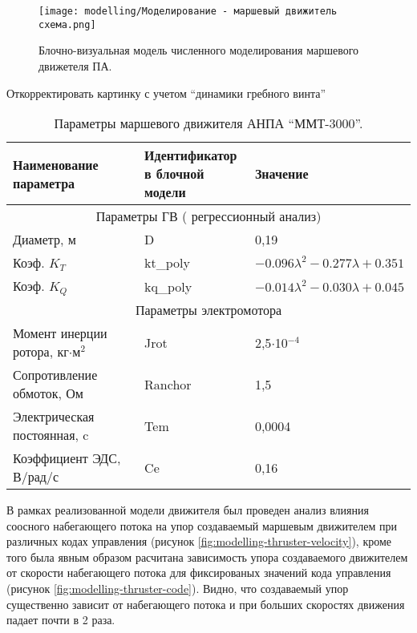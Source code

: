 \begin{figure}[ht]
    \centering
    \texttt{[image: modelling/Моделирование - маршевый движитель схема.png]}
    \caption{Блочно-визуальная модель численного моделирования маршевого движетеля ПА.}
    \label{fig:modelling-thruster}
\end{figure}

\begin{noteplan}
    Откорректировать картинку с учетом ``динамики гребного винта''
\end{noteplan}

\begin{table}
    \caption{Параметры маршевого движителя АНПА ``ММТ-3000''.}
    \label{tab:modelling-thruster}
    \centering
    \begin{tabular}{lll}
        \toprule
        \makecell[l]{Наименование \\ параметра} & \makecell[l]{Идентификатор \\ в блочной модели} & Значение \\
        \midrule
        \multicolumn{3}{c}{Параметры ГВ ( регрессионный анализ)} \\
        \midrule
        Диаметр, м  & D & 0,19\\
        Коэф. $K_T$ & kt\_poly & $-0.096\lambda^2 -0.277\lambda + 0.351$\\
        Коэф. $K_Q$ & kq\_poly & $-0.014\lambda^2 -0.030\lambda + 0.045$\\
        \midrule
        \multicolumn{3}{c}{Параметры электромотора} \\
        \midrule
        Момент инерции ротора, кг$\cdot$м$^2$ & Jrot & 2,5$\cdot$10$^{-4}$ \\
        Сопротивление обмоток, Ом & Ranchor & 1,5 \\
        Электрическая постоянная, c & Tem & 0,0004 \\
        Коэффициент ЭДС, В/рад/с & Ce & 0,16 \\
        \bottomrule
    \end{tabular}
\end{table}

В рамках реализованной модели движителя был проведен анализ влияния соосного набегающего потока на упор создаваемый маршевым движителем при различных кодах управления (рисунок \ref{fig:modelling-thruster-velocity}), кроме того была явным образом расчитана зависимость упора создаваемого движителем от скорости набегающего потока для фиксированых значений кода управления (рисунок \ref{fig:modelling-thruster-code}).
Видно, что создаваемый упор существенно зависит от набегающего потока и при больших скоростях движения падает почти в 2 раза.

